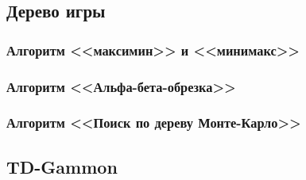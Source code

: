 \documentclass{vsureport}
\begin{document}
\subsection{Дерево игры}


\subsubsection{Алгоритм <<максимин>> и <<минимакс>>}


\subsubsection{Алгоритм <<Альфа-бета-обрезка>>}


\subsubsection{Алгоритм <<Поиск по дереву Монте-Карло>>}


\subsection{TD-Gammon}





\end{document}
